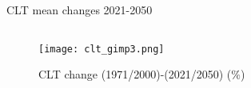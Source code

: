 \documentclass{beamer}%
\begin{document}

\begin{frame}[fragile]{CLT mean changes 2021-2050}
\vspace{1\baselineskip}
\begin{columns}
  \begin{column}{0.4\textwidth}
      \end{column}
      \begin{column}{0.7\textwidth}
   \end{column}
   \end{columns}
    \begin{figure}
      \texttt{[image: clt\_gimp3.png]}
        \centering\caption{CLT change (1971/2000)-(2021/2050) ($\%$)}
      \end{figure}
\end{frame}
 
\end{document}
